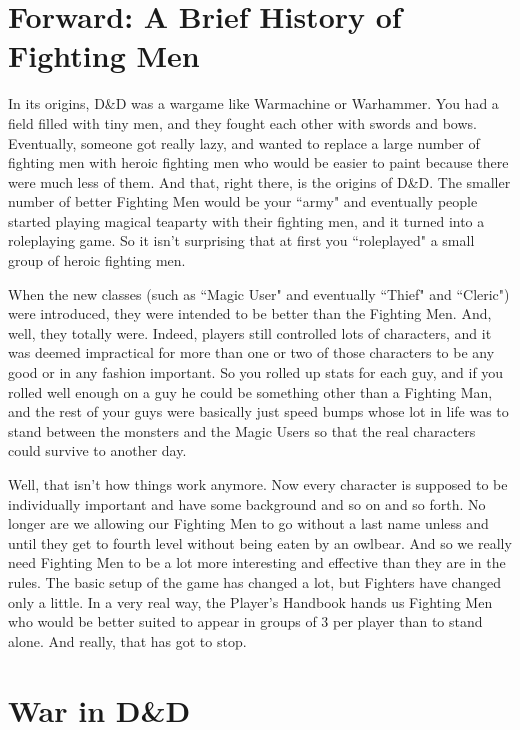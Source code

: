\section{Forward: A Brief History of Fighting Men}

In its origins, D\&D was a wargame like Warmachine or Warhammer. You had a field filled with tiny men, and they fought each other with swords and bows. Eventually, someone got really lazy, and wanted to replace a large number of fighting men with heroic fighting men who would be easier to paint because there were much less of them. And that, right there, is the origins of D\&D. The smaller number of better Fighting Men would be your ``army" and eventually people started playing magical teaparty with their fighting men, and it turned into a roleplaying game. So it isn't surprising that at first you ``roleplayed" a small group of heroic fighting men.

When the new classes (such as ``Magic User" and eventually ``Thief" and ``Cleric") were introduced, they were intended to be better than the Fighting Men. And, well, they totally were. Indeed, players still controlled lots of characters, and it was deemed impractical for more than one or two of those characters to be any good or in any fashion important. So you rolled up stats for each guy, and if you rolled well enough on a guy he could be something other than a Fighting Man, and the rest of your guys were basically just speed bumps whose lot in life was to stand between the monsters and the Magic Users so that the real characters could survive to another day.

Well, that isn't how things work anymore. Now every character is supposed to be individually important and have some background and so on and so forth. No longer are we allowing our Fighting Men to go without a last name unless and until they get to fourth level without being eaten by an owlbear. And so we really need Fighting Men to be a lot more interesting and effective than they are in the rules. The basic setup of the game has changed a lot, but Fighters have changed only a little. In a very real way, the Player's Handbook hands us Fighting Men who would be better suited to appear in groups of 3 per player than to stand alone. And really, that has got to stop.

\section{War in D\&D}
\vspace*{-10pt}

